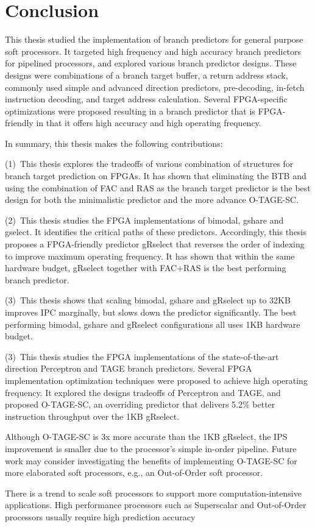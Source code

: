 \chapter{Conclusion}
\label{chap:conclusion}

This thesis studied the implementation of branch predictors for general purpose soft processors. It targeted high frequency and high accuracy branch predictors for pipelined processors, and explored various branch predictor designs. These designs were combinations of a branch target buffer, a return address stack, commonly used simple and advanced direction predictors, pre-decoding, in-fetch instruction decoding, and target address calculation. Several FPGA-specific optimizations were proposed resulting in a branch predictor that is FPGA-friendly in that it offers high accuracy and high operating frequency.

In summary, this thesis makes the following contributions:

(1)~This thesis explores the tradeoffs of various combination of structures for branch target prediction on FPGAs. It has shown that eliminating the BTB and using the combination of FAC and RAS as the branch target predictor is the best design for both the minimalistic predictor and the more advance \mbox{O-TAGE-SC}.

(2)~This thesis studies the FPGA implementations of bimodal, gshare and gselect. It identifies the critical paths of these predictors. Accordingly, this thesis proposes a FPGA-friendly predictor gRselect that reverses the order of indexing to improve maximum operating frequency. It has shown that within the same hardware budget, gRselect together with FAC+RAS is the best performing branch predictor.

(3)~This thesis shows that scaling bimodal, gshare and gRselect up to 32KB improves IPC marginally, but slows down the predictor significantly. The best performing bimodal, gshare and gRselect configurations all uses 1KB hardware budget.

(3)~This thesis studies the FPGA implementations of the state-of-the-art direction Perceptron and TAGE branch predictors. Several FPGA implementation optimization techniques were proposed to achieve high operating frequency. It explored the designs tradeoffs of Perceptron and TAGE, and proposed \mbox{O-TAGE-SC}, an overriding predictor that delivers 5.2\% better instruction throughput over the 1KB gRselect.

Although \mbox{O-TAGE-SC} is \mytilde 3x more accurate than the 1KB gRselect, the IPS improvement is  smaller due to the processor's simple in-order pipeline. Future work may consider investigating the benefits of implementing \mbox{O-TAGE-SC} for more elaborated soft processors, e.g., an Out-of-Order soft processor. 


There is a trend to scale soft processors to support more computation-intensive applications. High performance processors such as Superscalar and Out-of-Order processors usually require high prediction accuracy 